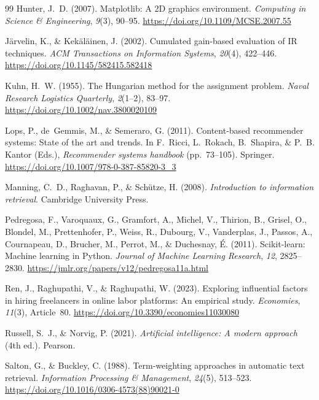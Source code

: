 \documentclass[12pt,a4paper]{article}
\numberwithin{equation}{section}
\theoremstyle{definition}
\theoremstyle{plain}
\begin{document}
\begin{thebibliography}{99}
Hunter, J.~D. (2007). Matplotlib: A 2D graphics environment. \textit{Computing in Science \& Engineering}, \textit{9}(3), 90--95. \url{https://doi.org/10.1109/MCSE.2007.55}

J\"{a}rvelin, K., \& Kek\"{a}l\"{a}inen, J. (2002). Cumulated gain-based evaluation of IR techniques. \textit{ACM Transactions on Information Systems}, \textit{20}(4), 422--446. \url{https://doi.org/10.1145/582415.582418}

Kuhn, H.~W. (1955). The Hungarian method for the assignment problem. \textit{Naval Research Logistics Quarterly}, \textit{2}(1--2), 83--97. \url{https://doi.org/10.1002/nav.3800020109}

Lops, P., de~Gemmis, M., \& Semeraro, G. (2011). Content-based recommender systems: State of the art and trends. In F.~Ricci, L.~Rokach, B.~Shapira, \& P.~B. Kantor (Eds.), \textit{Recommender systems handbook} (pp.~73--105). Springer. \url{https://doi.org/10.1007/978-0-387-85820-3_3}

Manning, C.~D., Raghavan, P., \& Sch\"{u}tze, H. (2008). \textit{Introduction to information retrieval}. Cambridge University Press.

Pedregosa, F., Varoquaux, G., Gramfort, A., Michel, V., Thirion, B., Grisel, O., Blondel, M., Prettenhofer, P., Weiss, R., Dubourg, V., Vanderplas, J., Passos, A., Cournapeau, D., Brucher, M., Perrot, M., \& Duchesnay, \'{E}. (2011). Scikit-learn: Machine learning in Python. \textit{Journal of Machine Learning Research}, \textit{12}, 2825--2830. \url{https://jmlr.org/papers/v12/pedregosa11a.html}

Ren, J., Raghupathi, V., \& Raghupathi, W. (2023). Exploring influential factors in hiring freelancers in online labor platforms: An empirical study. \textit{Economies}, \textit{11}(3), Article~80. \url{https://doi.org/10.3390/economies11030080}

Russell, S.~J., \& Norvig, P. (2021). \textit{Artificial intelligence: A modern approach} (4th ed.). Pearson.

Salton, G., \& Buckley, C. (1988). Term-weighting approaches in automatic text retrieval. \textit{Information Processing \& Management}, \textit{24}(5), 513--523. \url{https://doi.org/10.1016/0306-4573(88)90021-0}


\end{thebibliography}
\end{document}
